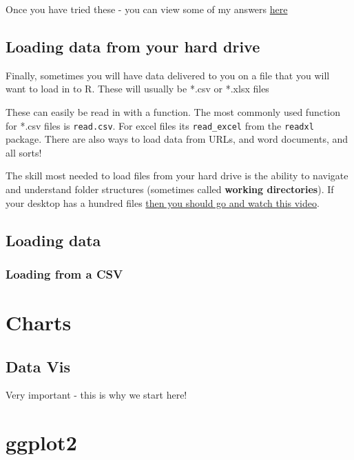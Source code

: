 \documentclass[
]{book}
\begin{document}
Once you have tried these - you can view some of my answers \protect\hyperlink{ans_createdata}{here}

\hypertarget{data_load}{%
\section{Loading data from your hard drive}\label{data_load}}

Finally, sometimes you will have data delivered to you on a file that you will want to load in to R. These will usually be *.csv or *.xlsx files

These can easily be read in with a function. The most commonly used function for *.csv files is \texttt{read.csv}. For excel files its \texttt{read\_excel} from the \texttt{readxl} package. There are also ways to load data from URLs, and word documents, and all sorts!

The skill most needed to load files from your hard drive is the ability to navigate and understand folder structures (sometimes called \textbf{working directories}). If your desktop has a hundred files \href{https://youtu.be/bKjRKZxr-KY}{then you should go and watch this video}.

\hypertarget{ex_data_load}{%
\section{Loading data}\label{ex_data_load}}

\hypertarget{loading-from-a-csv}{%
\subsection{Loading from a CSV}\label{loading-from-a-csv}}

\hypertarget{charts}{%
\chapter{Charts}\label{charts}}

\hypertarget{datavis}{%
\section{Data Vis}\label{datavis}}

Very important - this is why we start here!

\hypertarget{ggplot}{%
\chapter{ggplot2}\label{ggplot}}
\end{document}
